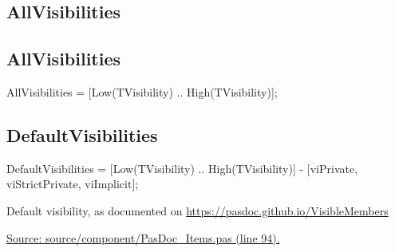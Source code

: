 \documentclass{report}
\newif\ifpdf
\begin{document}
\subsection*{\large{\textbf{AllVisibilities}}\normalsize\hspace{1ex}\hrulefill}
\else
\subsection*{AllVisibilities}
\fi
\label{PasDoc_Items-AllVisibilities}
\begin{list}{}{
\setlength{\itemindent}{0cm}
\setlength{\listparindent}{0cm}
\setlength{\leftmargin}{\evensidemargin}
\addtolength{\leftmargin}{\tmplength}
\settowidth{\labelsep}{X}
\addtolength{\leftmargin}{\labelsep}
\setlength{\labelwidth}{\tmplength}
}
\item[\textbf{Declaration}\hfill]
\ifpdf
\begin{flushleft}
\fi
\begin{ttfamily}
AllVisibilities = [Low(TVisibility) .. High(TVisibility)];\end{ttfamily}

\ifpdf
\end{flushleft}
\fi

\end{list}
\ifpdf
\subsection*{\large{\textbf{DefaultVisibilities}}\normalsize\hspace{1ex}\hrulefill}
\else
\subsection*{DefaultVisibilities}
\fi
\label{PasDoc_Items-DefaultVisibilities}
\begin{list}{}{
\setlength{\itemindent}{0cm}
\setlength{\listparindent}{0cm}
\setlength{\leftmargin}{\evensidemargin}
\addtolength{\leftmargin}{\tmplength}
\settowidth{\labelsep}{X}
\addtolength{\leftmargin}{\labelsep}
\setlength{\labelwidth}{\tmplength}
}
\item[\textbf{Declaration}\hfill]
\ifpdf
\begin{flushleft}
\fi
\begin{ttfamily}
DefaultVisibilities = [Low(TVisibility) .. High(TVisibility)] -
    [viPrivate, viStrictPrivate, viImplicit];\end{ttfamily}

\ifpdf
\end{flushleft}
\fi

\par
\item[\textbf{Description}]
Default visibility, as documented on \href{https://pasdoc.github.io/VisibleMembers}{https://pasdoc.github.io/VisibleMembers}\par
\href{https://github.com/pasdoc/pasdoc/blob/master/source/component/PasDoc_Items.pas#L94}{Source: source/component/PasDoc{\_}Items.pas (line 94).}

\end{list}
\ifpdf
\end{document}
